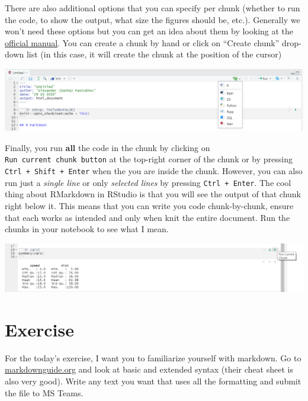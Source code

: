 \documentclass[
]{book}
\begin{document}
There are also additional options that you can specify per chunk (whether to run the code, to show the output, what size the figures should be, etc.). Generally we won't need these options but you can get an idea about them by looking at the \href{https://yihui.org/knitr/options/}{official manual}. You can create a chunk by hand or click on ``Create chunk'' drop-down list (in this case, it will create the chunk at the position of the cursor)

\begin{center}\includegraphics[width=1\linewidth]{images/notebook-insert-chunk} \end{center}

Finally, you run \textbf{all} the code in the chunk by clicking on \texttt{Run\ current\ chunk\ button} at the top-right corner of the chunk or by pressing \texttt{Ctrl\ +\ Shift\ +\ Enter} when the you are inside the chunk. However, you can also run just a \emph{single line} or only \emph{selected lines} by pressing \texttt{Ctrl\ +\ Enter}. The cool thing about RMarkdown in RStudio is that you will see the output of that chunk right below it. This means that you can write you code chunk-by-chunk, ensure that each works as intended and only when knit the entire document. Run the chunks in your notebook to see what I mean.

\begin{center}\includegraphics[width=1\linewidth]{images/notebook-run-chunk} \end{center}

\hypertarget{exercise}{%
\section{Exercise}\label{exercise}}

For the today's exercise, I want you to familiarize yourself with markdown. Go to \href{https://www.markdownguide.org/}{markdownguide.org} and look at basic and extended syntax (their cheat sheet is also very good). Write any text you want that uses all the formatting and submit the file to MS Teams.
\end{document}
